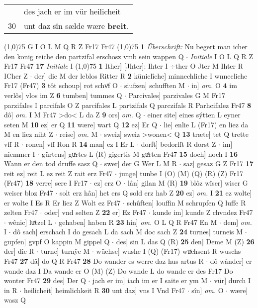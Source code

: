 \documentclass[8pt,a4paper,notitlepage]{article}
\begin{document}
\begin{table}[ht]
\begin{minipage}[t]{0.5\linewidth}
\begin{tabular}{rl}
 & des jach er im vür heilicheit\\ 
30 & unt daz sîn sælde wære \textbf{breit}.\\ 
\end{tabular}
\scriptsize
\line(1,0){75} \newline
G I O L M Q R Z Fr17 Fr47 \newline
\line(1,0){75} \newline
\textbf{1} \textit{Überschrift:} Nu begert man icher den konig reiche den partzifal erschosz vmb sein wappen Q   $\cdot$ \textit{Initiale} I O L Q R Z Fr17 Fr47  \textbf{17} \textit{Initiale} I  \newline
\line(1,0){75} \newline
\textbf{1} Ither] [Jhter]: Ihter I ÷ther O Jter M Ihter R ICher Z  $\cdot$ der] die M der leblos Ritter R \textbf{2} küniclîche] minnechliche I wnnecliche Fr17 (Fr47) \textbf{3} tôt schoup] rot schvͤf O  $\cdot$ siufzen] schufften M  $\cdot$ in] \textit{om.} O \textbf{4} im verlôs] vlos im Z \textbf{6} tumben] tummes Q  $\cdot$ Parcivales] parzivales G M Fr17 parzifales I parcifals O Z parcifales L partzifals Q parczifals R Parhcifalez Fr47 \textbf{8} dô] \textit{om.} I M Fr47 >do< L da Z \textbf{9} ors] \textit{om.} Q  $\cdot$ einer site] eines sýtten L eyner seten M \textbf{10} ez] er Q \textbf{11} wære] wart Q \textbf{12} ez] Er Q  $\cdot$ lie] enlie L (Fr17) en liez da M en liez niht Z  $\cdot$ reise] \textit{om.} M  $\cdot$ sweiz] sweiz >wonen< Q \textbf{13} træte] tet Q trette vff R  $\cdot$ ronen] vff Ron R \textbf{14} man] ez I Er L  $\cdot$ dorft] bedorfft R dorst Z  $\cdot$ im] niemmer I  $\cdot$ gürtens] guͯrtes L (R) gigertis M guͤrten Fr47 \textbf{15} doch] noch I \textbf{16} Wann er den tod druffe sasz Q  $\cdot$ swer] der G Wer L M R  $\cdot$ saz] gesaz G Z Fr17 \textbf{17} reit ez] reit L ez reit Z rait erz Fr47  $\cdot$ junge] tunbe I (O) (M) (Q) (R) (Z) Fr17 (Fr47) \textbf{18} verre] sere I Fr17  $\cdot$ ez] erz O  $\cdot$ lân] gilan M (R) \textbf{19} blôz wîser] wiser G weiser bloz Fr47  $\cdot$ solt erz hân] het ers Q sold erz hab Z \textbf{20} ez] \textit{om.} I \textbf{21} ez wolte] er wolte I Es R Er liez Z Wolt ez Fr47  $\cdot$ schûften] louffin M schrupfen Q luffe R zelten Fr47  $\cdot$ oder] vnd selten Z \textbf{22} er] Ez Fr47  $\cdot$ kunde im] kunde Z chvndez Fr47  $\cdot$ wênic] luͯtzel L  $\cdot$ gehaben] haben R \textbf{23} hin] \textit{om.} O L Q R Fr47 En M  $\cdot$ dem] \textit{om.} I  $\cdot$ dô sach] erschach I do gesach L da sach M doc sach Z \textbf{24} turnes] turneis M  $\cdot$ gupfen] gvpf O kappin M gippel Q  $\cdot$ des] sin L das Q (R) \textbf{25} den] Deme M (Z) \textbf{26} der] die R  $\cdot$ turne] turnÿe M  $\cdot$ wüehse] wushe I (Q) (Fr17) wuͯchsent R wuschs Fr47 \textbf{27} dâ] do Q R Fr47 \textbf{28} Do wander es werre daz hus artus R  $\cdot$ dô wânder] er wande daz I Da wande er O (M) (Z) Do wande L do wande er des Fr17 Do wonter Fr47 \textbf{29} des] Der Q  $\cdot$ jach er im] iach im er I saite er ym M  $\cdot$ vür] durch I in R  $\cdot$ heilicheit] heimlichkeit R \textbf{30} unt daz] vns I Vnd Fr47  $\cdot$ sîn] \textit{om.} O  $\cdot$ wære] wasz Q \newline

\end{minipage}
\end{table}
\end{document}
